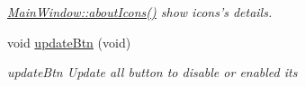 \begin{DoxyCompactItemize}
\begin{DoxyCompactList}\small\item\em \hyperlink{classGui_1_1MainWindow_a56db09003bd79c8635488d0edc57cdb3}{Main\+Window\+::about\+Icons()} show icons's details. \end{DoxyCompactList}\item 
\hypertarget{classGui_1_1MainWindow_a39723aa0949414313efad1528a856dfd}{void \hyperlink{classGui_1_1MainWindow_a39723aa0949414313efad1528a856dfd}{update\+Btn} (void)}\label{classGui_1_1MainWindow_a39723aa0949414313efad1528a856dfd}

\begin{DoxyCompactList}\small\item\em update\+Btn Update all button to disable or enabled its \end{DoxyCompactList}\end{DoxyCompactItemize}
